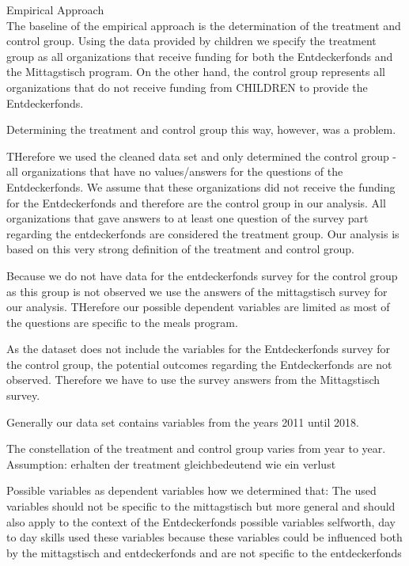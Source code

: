 \documentclass[12pt, a4paper, titlepage]{article}\usepackage[]{graphicx}\usepackage[]{color}
\begin{document}
Empirical Approach\\

The baseline of the empirical approach is the determination of the treatment and control group. Using the data provided by children we specify the treatment group as all organizations that receive funding for both the Entdeckerfonds and the Mittagstisch program. On the other hand, the control group represents all organizations that do not receive funding from CHILDREN to provide the Entdeckerfonds.

Determining the treatment and control group this way, however, was a problem.

THerefore we used the cleaned data set and only determined the control group - all organizations that have no values/answers for the questions of the Entdeckerfonds. We assume that these organizations did not receive the funding for the Entdeckerfonds and therefore are the control group in our analysis. All organizations that gave answers to at least one question of the survey part regarding the entdeckerfonds are considered the treatment group. 
Our analysis is based on this very strong definition of the treatment and control group.

Because we do not have data for the entdeckerfonds survey for the control group as this group is not observed we use the answers of the mittagstisch survey for our analysis. THerefore our possible dependent variables are limited as most of the questions are specific to the meals program. 

As the dataset does not include the variables for the Entdeckerfonds survey for the control group, the potential outcomes regarding the Entdeckerfonds are not observed. Therefore we have to use the survey answers from the Mittagstisch survey.

Generally our data set contains variables from the years 2011 until 2018. 

The constellation of the treatment and control group varies from year to year. 
Assumption: erhalten der treatment gleichbedeutend wie ein verlust

Possible variables as dependent variables
how we determined that:
The used variables should not be specific to the mittagstisch but more general and should also apply to the context of the Entdeckerfonds
possible variables selfworth, day to day skills
used these variables because these variables could be influenced both by the mittagstisch and entdeckerfonds and are not specific to the entdeckerfonds
\end{document}
